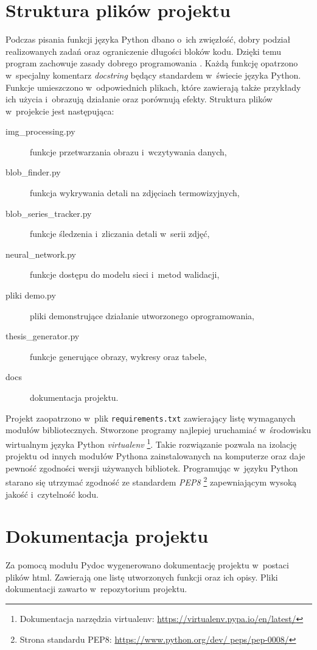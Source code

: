 \section{Struktura plików projektu}
Podczas pisania funkcji języka Python dbano o~ich zwięzłość, dobry podział
realizowanych zadań oraz ograniczenie długości bloków kodu.
Dzięki temu program zachowuje zasady dobrego programowania \cite{martin_code}.
Każdą funkcję opatrzono w~specjalny komentarz \emph{docstring} będący standardem
w~świecie języka Python.
Funkcje umieszczono w~odpowiednich plikach, które zawierają także przykłady ich
użycia i~obrazują działanie oraz porównują efekty.
Struktura plików w~projekcie jest następująca:
\begin{description}
    \item[img\_processing.py]
        funkcje przetwarzania obrazu i~wczytywania danych,
    \item[blob\_finder.py]
        funkcja wykrywania detali na zdjęciach termowizyjnych,
    \item[blob\_series\_tracker.py]
        funkcje śledzenia i~zliczania detali w~serii zdjęć,
    \item[neural\_network.py]
        funkcje dostępu do modelu sieci i~metod walidacji,
    \item[pliki demo.py]
        pliki demonstrujące działanie utworzonego oprogramowania,
    \item[thesis\_generator.py]
        funkcje generujące obrazy, wykresy oraz tabele,
    \item[docs] dokumentacja projektu.
\end{description}

Projekt zaopatrzono w~plik \texttt{requirements.txt} zawierający listę
wymaganych modułów bibliotecznych.
Stworzone programy najlepiej uruchamiać w~środowisku wirtualnym języka Python
\emph{virtualenv}%
\footnote{%
    Dokumentacja narzędzia virtualenv:
    \url{https://virtualenv.pypa.io/en/latest/}}.
Takie rozwiązanie pozwala na izolację projektu od innych modułów Pythona
zainstalowanych na komputerze oraz daje pewność zgodności wersji używanych
bibliotek.
Programując w~języku Python starano się utrzymać zgodność ze standardem
\emph{PEP8}%
\footnote{%
    Strona standardu PEP8: \url{https://www.python.org/dev/ peps/pep-0008/}}
zapewniającym wysoką jakość i~czytelność kodu.

\section{Dokumentacja projektu}
Za pomocą modułu Pydoc wygenerowano dokumentację projektu w~postaci plików
html.
Zawierają one listę utworzonych funkcji oraz ich opisy.
Pliki dokumentacji zawarto w~repozytorium projektu.

